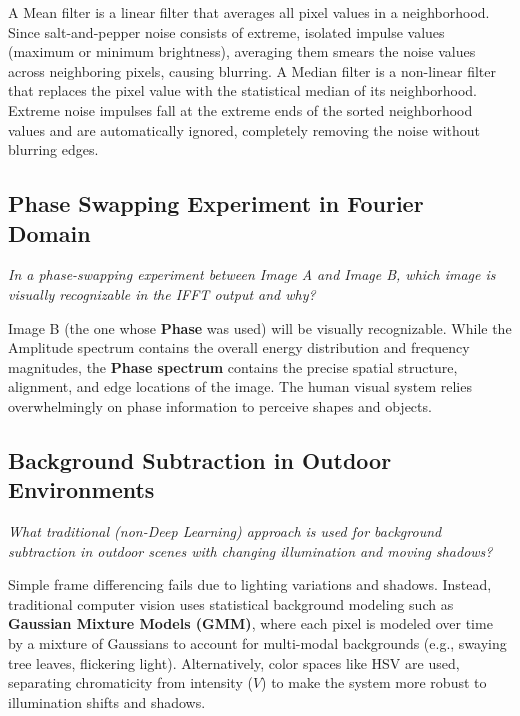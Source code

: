 A Mean filter is a linear filter that averages all pixel values in a neighborhood. Since salt-and-pepper noise consists of extreme, isolated impulse values (maximum or minimum brightness), averaging them smears the noise values across neighboring pixels, causing blurring.
A Median filter is a non-linear filter that replaces the pixel value with the statistical median of its neighborhood. Extreme noise impulses fall at the extreme ends of the sorted neighborhood values and are automatically ignored, completely removing the noise without blurring edges.

\subsection{Phase Swapping Experiment in Fourier Domain}
\textit{In a phase-swapping experiment between Image A and Image B, which image is visually recognizable in the IFFT output and why?}

Image B (the one whose \textbf{Phase} was used) will be visually recognizable.
While the Amplitude spectrum contains the overall energy distribution and frequency magnitudes, the \textbf{Phase spectrum} contains the precise spatial structure, alignment, and edge locations of the image. The human visual system relies overwhelmingly on phase information to perceive shapes and objects.

\subsection{Background Subtraction in Outdoor Environments}
\textit{What traditional (non-Deep Learning) approach is used for background subtraction in outdoor scenes with changing illumination and moving shadows?}

Simple frame differencing fails due to lighting variations and shadows. Instead, traditional computer vision uses statistical background modeling such as \textbf{Gaussian Mixture Models (GMM)}, where each pixel is modeled over time by a mixture of Gaussians to account for multi-modal backgrounds (e.g., swaying tree leaves, flickering light). Alternatively, color spaces like HSV are used, separating chromaticity from intensity ($V$) to make the system more robust to illumination shifts and shadows.

\subsection[Question -- {\it Tracking Failures and Hybrid Architecture}]{}

